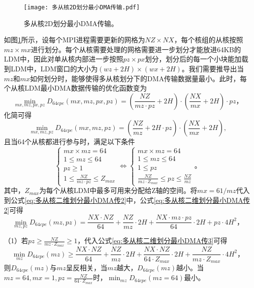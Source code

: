 \begin{figure}[ht]
  \centering
  \texttt{[image: 多从核2D划分最小DMA传输.pdf]}
  \caption{多从核2D划分最小DMA传输。}
  \label{fig:multi-cpe-2d-derive}
\end{figure}

如图\ref{fig:multi-cpe-2d-derive}所示，设每个MPI进程需要更新的网格为$NZ\times NX$，每个核组的从核按照$mz \times mx$进行划分。每个从核需要处理的网格需要进一步划分才能放进64KB的LDM中，因此对单从核内部进一步按照$pz\times px$划分，划分后的每一个小块能加载到LDM中，LDM窗口的大小为$(wz+2H)\times(wx+2H)$。我们需要推导出当$mz$和$mx$如何划分时，能够使得多从核划分下的DMA传输数据量最小。此时，每个从核LDM最小DMA数据传输的优化函数变为
\begin{equation}
  \min_{mx,mz,px,pz} D_{64cpe}(mx,mz,px,pz) = (\frac{NZ}{mz\cdot pz}+2H)\cdot(\frac{NX}{mx}+2H)\cdot pz，
  \label{eq:多从核二维划分最小DMA传输}
\end{equation}
化简可得
\begin{equation}
  \min_{mx,mz,pz} D_{64cpe}(mx,mz,pz) = (\frac{NZ}{mz}+2H\cdot pz)\cdot(\frac{NX}{mx}+2H),
  \label{eq:多从核二维划分最小DMA传2}
\end{equation}
且当64个从核都进行参与时，满足以下条件
\begin{equation*}
    \left\{\begin{matrix}
mx\times mz=64\\
1\le mz \le 64 \\
pz \ge 1 \\
1 \le \frac{NZ}{mz\cdot pz} \le Z_{max}
\end{matrix}\right.
\Leftrightarrow
  \left\{\begin{matrix}
mx\times mz=64\\
1\le mz \le 64 \\
1 \le pz \\
\frac{NZ}{mz\cdot Z_{max}} \le pz \le \frac{NZ}{mz}
\end{matrix}\right.。
\end{equation*}
其中，$Z_{max}$为每个从核LDM中最多可用来分配给Z轴的空间。将$mx=61/mz$代入到公式\ref{eq:多从核二维划分最小DMA传2}中，公式\ref{eq:多从核二维划分最小DMA传2}可得
\begin{equation}
  \min_{mz,pz} D_{64cpe}(mz,pz) = \frac{NX\cdot NZ}{64}+\frac{NZ}{mz}\cdot 2H+\frac{NX\cdot mz \cdot pz}{64} \cdot 2H + pz\cdot 4H^2，
  \label{eq:多从核二维划分最小DMA传3}
\end{equation}

（1）若$pz \ge \frac{NZ}{mz\cdot Z_{max}} \ge 1$，代入公式\ref{eq:多从核二维划分最小DMA传3}可得
\begin{equation}
  \min_{mz} D_{64cpe}(mz) \ge \frac{NX\cdot NZ}{64}+\frac{NZ}{mz}\cdot 2H+\frac{NX\cdot NZ}{64\cdot Z_{max}} \cdot 2H + \frac{NZ}{mz\cdot Z_{max}}\cdot 4H^2，
  \label{eq:多从核二维划分最小DMA传4}
\end{equation}
则$D_{64cpe}(mz) $与$mz$呈反相关，当$mz$越大，$D_{64cpe}(mz) $越小。当$mz=64, mx=1, pz = \frac{NZ}{64\cdot Z_{max}}$时，$\min_{mz} D_{64cpe}(mz=64)$最小。

